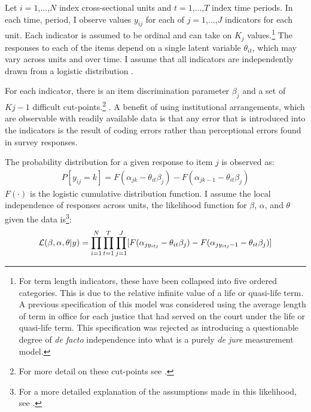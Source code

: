 \documentclass[12pt]{article}
\begin{document}
Let $i=1$,...,$N$ index cross-sectional units and $t=1$,...,$T$ index time periods.  In each time, period, I observe values $y_{ij}$ for each of $j=1$,...,$J$ indicators for each unit.  Each indicator is assumed to be ordinal and can take on $K_j$ values.\footnote{For term length indicators, these have been collapsed into five ordered categories.  This is due to the relative infinite value of a life or quasi-life term.  A previous specification of this model was considered using the average length of term in office for each justice that had served on the court under the life or quasi-life term.  This specification was rejected as introducing a questionable degree of \textit{de facto} independence into what is a purely \textit{de jure} measurement model.}  The responses to each of the items depend on a single latent variable $\theta_{it}$, which may vary across units and over time. I assume that all indicators are independently drawn from a logistic distribution \citep[7]{Schnakenberg2014}. 

For each indicator, there is an item discrimination parameter $\beta_j$ and a set of $Kj-1$ difficult cut-points.\footnote{For more detail on these cut-points see \citep{Treier2008,Schnakenberg2014}.  } \citep[7]{Schnakenberg2014}.  A benefit of using institutional arrangements, which are observable with readily available data is that any error that is introduced into the indicators is the result of coding errors rather than perceptional errors found in survey responses.  

The probability distribution for a given response to item $j$ is observed as:
\begin{align}
P[y_{ij}=k]=F(\alpha_{jk}-\theta_{it}\beta_j)-F(\alpha_{jk-1}-\theta_{it}\beta_j)
\end{align} $F(\cdot)$ is the logistic cumulative distribution function.  I assume the local independence of responses across units, the likelihood function for $\beta$, $\alpha$, and $\theta$ given the data is\footnote{For a more detailed explanation of the assumptions made in this likelihood, see \citep[8]{Schnakenberg2014}.}:
\begin{align}\label{like}
{\cal L} (\beta,\alpha,\theta|y)=\prod_{i=1}^{N}\prod_{t=1}^{T}\prod_{j=1}^{J}[F(\alpha_{jy_{itj}}-\theta_{it}\beta_j)-F(\alpha_{jy_{itj}-1}-\theta_{it}\beta_j)]
\end{align} 
\end{document}
